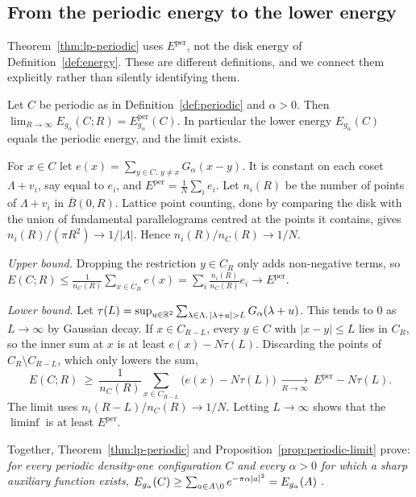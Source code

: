 \subsection{From the periodic energy to the lower energy}

Theorem~\ref{thm:lp-periodic} uses $E^{\mathrm{per}}$, not the disk energy of Definition~\ref{def:energy}. These are
different definitions, and we connect them explicitly rather than silently identifying them.

\begin{proposition}\label{prop:periodic-limit}
Let $C$ be periodic as in Definition~\ref{def:periodic} and $\alpha>0$. Then
$\lim_{R\to\infty}E_{g_\alpha}(C;R)=E^{\mathrm{per}}_{g_\alpha}(C)$. In particular the lower energy $E_{g_\alpha}(C)$ equals
the periodic energy, and the limit exists. \tierC{}
\end{proposition}
\begin{humanproof}
For $x\in C$ let $e(x)=\sum_{y\in C,\,y\ne x}G_\alpha(x-y)$. It is constant on each coset $\Lambda+v_i$, say equal to
$e_i$, and $E^{\mathrm{per}}=\frac1N\sum_ie_i$. Let $n_i(R)$ be the number of points of $\Lambda+v_i$ in
$\overline B(0,R)$. Lattice point counting, done by comparing the disk with the union of fundamental parallelograms
centred at the points it contains, gives $n_i(R)/(\pi R^2)\to1/|\Lambda|$. Hence $n_i(R)/n_C(R)\to1/N$.

\emph{Upper bound.} Dropping the restriction $y\in C_R$ only adds non-negative terms, so
$E(C;R)\le\frac1{n_C(R)}\sum_{x\in C_R}e(x)=\sum_i\frac{n_i(R)}{n_C(R)}e_i\to E^{\mathrm{per}}$.

\emph{Lower bound.} Let $\tau(L)=\sup_{u\in\R^2}\sum_{\lambda\in\Lambda,\,|\lambda+u|>L}G_\alpha(\lambda+u)$. This tends
to $0$ as $L\to\infty$ by Gaussian decay. If $x\in C_{R-L}$, every $y\in C$ with $|x-y|\le L$ lies in $C_R$, so the
inner sum at $x$ is at least $e(x)-N\tau(L)$. Discarding the points of $C_R\setminus C_{R-L}$, which only lowers the sum,
\[
  E(C;R)\ \ge\ \frac{1}{n_C(R)}\sum_{x\in C_{R-L}}\bigl(e(x)-N\tau(L)\bigr)\ \xrightarrow[R\to\infty]{}\ E^{\mathrm{per}}-N\tau(L).
\]
The limit uses $n_i(R-L)/n_C(R)\to1/N$. Letting $L\to\infty$ shows that the $\liminf$ is at least $E^{\mathrm{per}}$.
\end{humanproof}

Together, Theorem~\ref{thm:lp-periodic} and Proposition~\ref{prop:periodic-limit} prove: \emph{for every periodic
density-one configuration $C$ and every $\alpha>0$ for which a sharp auxiliary function exists,
$E_{g_\alpha}(C)\ge\sum_{a\in A\setminus0}e^{-\pi\alpha|a|^2}=E_{g_\alpha}(A)$} \tierC{}.

